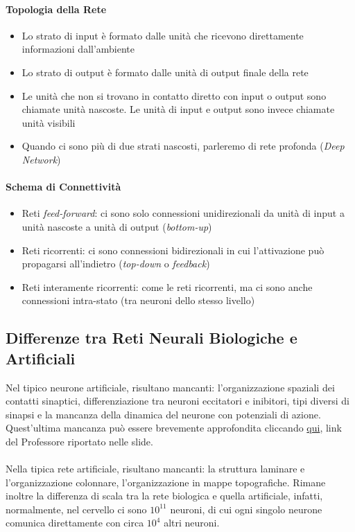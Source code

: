\documentclass[12pt, a4paper]{article}
\begin{document}
\paragraph{Topologia della Rete}
\begin{itemize}
    \item Lo strato di input è formato dalle unità che ricevono direttamente informazioni dall'ambiente
    \item Lo strato di output è formato dalle unità di output finale della rete
    \item Le unità che non si trovano in contatto diretto con input o output sono chiamate unità nascoste. Le unità di input e output sono invece chiamate unità visibili
    \item Quando ci sono più di due strati nascosti, parleremo di rete profonda (\textit{Deep Network})
\end{itemize}

\paragraph{Schema di Connettività}
\begin{itemize}
    \item Reti \textit{feed-forward}: ci sono solo connessioni unidirezionali da unità di input a unità nascoste a unità di output (\textit{bottom-up})
    \item Reti ricorrenti: ci sono connessioni bidirezionali in cui l'attivazione può propagarsi all'indietro (\textit{top-down} o \textit{feedback})
    \item Reti interamente ricorrenti: come le reti ricorrenti, ma ci sono anche connessioni intra-stato (tra neuroni dello stesso livello)
\end{itemize}

\subsection{Differenze tra Reti Neurali Biologiche e Artificiali}
Nel tipico neurone artificiale, risultano mancanti: l'organizzazione spaziali dei contatti sinaptici, differenziazione tra neuroni eccitatori e inibitori, tipi diversi di sinapsi e la mancanza della dinamica del neurone con potenziali di azione.\\
Quest'ultima mancanza può essere brevemente approfondita cliccando \href{https://it.wikipedia.org/wiki/Rete_neurale_spiking}{qui}, link del Professore riportato nelle slide.\\\\
Nella tipica rete artificiale, risultano mancanti: la struttura laminare e l'organizzazione colonnare, l'organizzazione in mappe topografiche.
Rimane inoltre la differenza di scala tra la rete biologica e quella artificiale, infatti, normalmente, nel cervello ci sono \(10^{11}\) neuroni, di cui ogni singolo neurone comunica direttamente con circa \(10^{4}\) altri neuroni.
\end{document}
